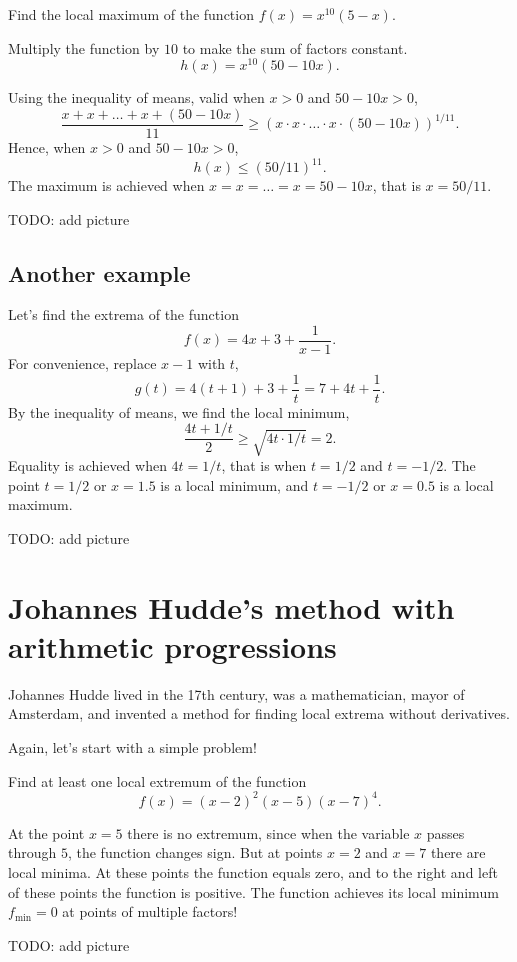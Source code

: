 \documentclass[12pt]{article}
\begin{document}
Find the local maximum of the function $f(x) = x^{10} (5 - x)$.

Multiply the function by $10$ to make the sum of factors constant.
\[
h(x) = x^{10}(50 - 10x).
\]

Using the inequality of means, valid when $x > 0$ and $50 - 10x > 0$,
\[
\frac{x + x + \dots + x + (50 - 10x)}{11} \geq (x \cdot x \cdot \dots \cdot x \cdot (50 - 10x) )^{1/11}.
\]
Hence, when $x > 0$ and $50 - 10x > 0$,
\[
h(x) \leq (50/11)^{11}.
\]
The maximum is achieved when $x = x = \dots = x = 50 - 10x$, that is $x = 50/11$.

TODO: add picture

\subsection*{Another example}

Let's find the extrema of the function 
\[
f(x) = 4x + 3 + \frac{1}{x - 1}.
\]
For convenience, replace $x - 1$ with $t$,
\[
g(t) = 4(t + 1) + 3 + \frac{1}{t} = 7 + 4t + \frac{1}{t}.
\]
By the inequality of means, we find the local minimum,
\[
\frac{4t + 1/t}{2} \geq \sqrt{4t \cdot 1/t} = 2.
\]
Equality is achieved when $4t = 1/t$, that is when $t = 1/2$ and $t = -1/2$.
The point $t=1/2$ or $x = 1.5$ is a local minimum, and $t = -1/2$ or $x = 0.5$ is a local maximum.


TODO: add picture


\section{Johannes Hudde's method with arithmetic progressions}

Johannes Hudde lived in the 17th century, was a mathematician, mayor of Amsterdam, and invented a method for finding local extrema without derivatives. 

Again, let's start with a simple problem!

Find at least one local extremum of the function
\[
f(x)  = (x - 2)^2 (x - 5) (x - 7)^4.
\]

At the point $x=5$ there is no extremum, since when the variable $x$ passes through $5$, the function changes sign. 
But at points $x = 2$ and $x = 7$ there are local minima. 
At these points the function equals zero, and to the right and left of these points the function is positive. 
The function achieves its local minimum $f_{\text{min}} = 0$ at points of multiple factors!


TODO: add picture
\end{document}
